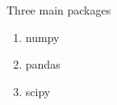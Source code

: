 \documentclass{beamer}
\begin{document}




\begin{frame}
	\huge
Three main packages
\begin{enumerate}
\item numpy
\item pandas
\item scipy
\end{enumerate}
\end{frame}








\end{document}
